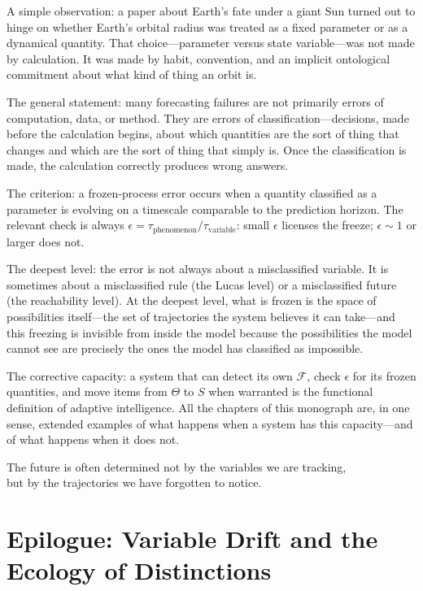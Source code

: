 \documentclass[11pt]{book}
\theoremstyle{plain}
\theoremstyle{definition}
\theoremstyle{remark}
\begin{document}
A simple observation: a paper about Earth's fate under a giant Sun turned out to hinge on whether Earth's orbital radius was treated as a fixed parameter or as a dynamical quantity. That choice---parameter versus state variable---was not made by calculation. It was made by habit, convention, and an implicit ontological commitment about what kind of thing an orbit is.

The general statement: many forecasting failures are not primarily errors of computation, data, or method. They are errors of classification---decisions, made before the calculation begins, about which quantities are the sort of thing that changes and which are the sort of thing that simply is. Once the classification is made, the calculation correctly produces wrong answers.

The criterion: a frozen-process error occurs when a quantity classified as a parameter is evolving on a timescale comparable to the prediction horizon. The relevant check is always $\epsilon = \tau_{\mathrm{phenomenon}} / \tau_{\mathrm{variable}}$: small $\epsilon$ licenses the freeze; $\epsilon \sim 1$ or larger does not.

The deepest level: the error is not always about a misclassified variable. It is sometimes about a misclassified rule (the Lucas level) or a misclassified future (the reachability level). At the deepest level, what is frozen is the space of possibilities itself---the set of trajectories the system believes it can take---and this freezing is invisible from inside the model because the possibilities the model cannot see are precisely the ones the model has classified as impossible.

The corrective capacity: a system that can detect its own $\mathcal{F}$, check $\epsilon$ for its frozen quantities, and move items from $\Theta$ to $S$ when warranted is the functional definition of adaptive intelligence. All the chapters of this monograph are, in one sense, extended examples of what happens when a system has this capacity---and of what happens when it does not.

\begin{tcolorbox}[title={The Final Principle}]
\centering
The future is often determined not by the variables we are tracking,\\
but by the trajectories we have forgotten to notice.
\end{tcolorbox}

\chapter*{Epilogue: Variable Drift and the Ecology of Distinctions}
\end{document}
